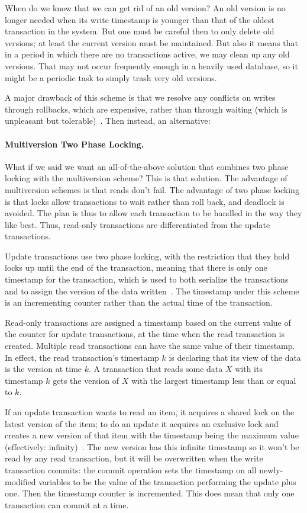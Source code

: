 When do we know that we can get rid of an old version? An old version is no longer needed when its write timestamp is younger than that of the oldest transaction in the system. But one must be careful then to only delete old versions; at least the current version must be maintained. But also it means that in a period in which there are no transactions active, we may clean up any old versions. That may not occur frequently enough in a heavily used database, so it might be a periodic task to simply trash very old versions.

A major drawback of this scheme is that we resolve any conflicts on writes through rollbacks, which are expensive, rather than through waiting (which is unpleasant but tolerable)~\cite{dsc}. Then instead, an alternative:

\paragraph{Multiversion Two Phase Locking.} What if we said we want an all-of-the-above solution that combines two phase locking with the multiversion scheme? This is that solution. The advantage of multiversion schemes is that reads don't fail. The advantage of two phase locking is that locks allow transactions to wait rather than roll back, and deadlock is avoided. The plan is thus to allow each transaction to be handled in the way they like best. Thus, read-only transactions are differentiated from the update transactions.

Update transactions use two phase locking, with the restriction that they hold locks up until the end of the transaction, meaning that there is only one timestamp for the transaction, which is used to both serialize the transactions and to assign the version of the data written~\cite{dsc}. The timestamp under this scheme is an incrementing counter rather than the actual time of the transaction. 

Read-only transactions are assigned a timestamp based on the current value of the counter for update transactions, at the time when the read transaction is created. Multiple read transactions can have the same value of their timestamp. In effect, the read transaction's timestamp $k$ is declaring that its view of the data is the version at time $k$. A transaction that reads some data $X$ with its timestamp $k$ gets the version of $X$ with the largest timestamp less than or equal to $k$. 

If an update transaction wants to read an item, it acquires a shared lock on the latest version of the item; to do an update it acquires an exclusive lock and creates a new version of that item with the timestamp being the maximum value (effectively: infinity)~\cite{dsc}. The new version has this infinite timestamp so it won't be read by any read transaction, but it will be overwritten when the write transaction commits:  the commit operation sets the timestamp on all newly-modified variables to be the value of the transaction performing the update plus one. Then the timestamp counter is incremented. This does mean that only one transaction can commit at a time.





